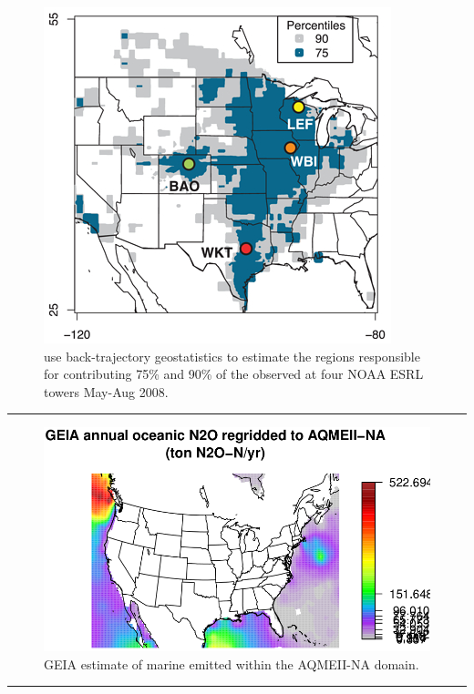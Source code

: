 \documentclass{a0poster} %
\begin{document}
\begin{textblock}{30}
\begin{figure}[h!]
  \centering
    \includegraphics[scale=1.5]{Miller_et_al_2012_fig02}
    \caption{\citet{miller_regional_2012} use back-trajectory geostatistics to estimate the regions responsible for contributing 75\% and 90\% of the  observed at four NOAA ESRL towers May-Aug 2008.}
\end{figure}
\vspace{-20mm}\rule{\textwidth}{1pt}

\begin{figure}[h!]
  \centering
    \includegraphics[scale=1.0]{GEIA_N2O_oceanic_regrid}
    \caption{GEIA estimate of marine  emitted within the AQMEII-NA domain.}
\end{figure}
\vspace{-20mm}\rule{\textwidth}{1pt}


\end{textblock}
\end{document}
